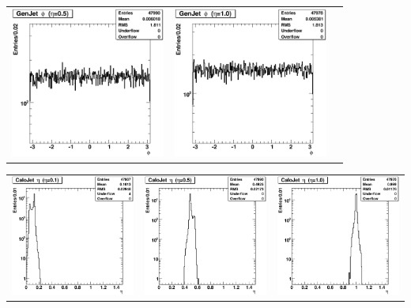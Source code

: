 \documentclass{cmspaper}
\begin{document}
\begin{appendices}
\begin{center}
\begin{tabular}{lll}
  \includegraphics[width=2in]{figs/h_GenJetPhi_corr_eta0.5.eps} &
  \includegraphics[width=2in]{figs/h_GenJetPhi_corr_eta1.0.eps} \\
 \end{tabular}
\end{center}
\begin{center}
 \begin{tabular}{lll}
  \includegraphics[width=2in]{figs/h_CaloJetEta_corr_eta0.1.eps} &
  \includegraphics[width=2in]{figs/h_CaloJetEta_corr_eta0.5.eps} &
  \includegraphics[width=2in]{figs/h_CaloJetEta_corr_eta1.0.eps} \\

\end{tabular}
\end{center}
\end{appendices}
\end{document}
